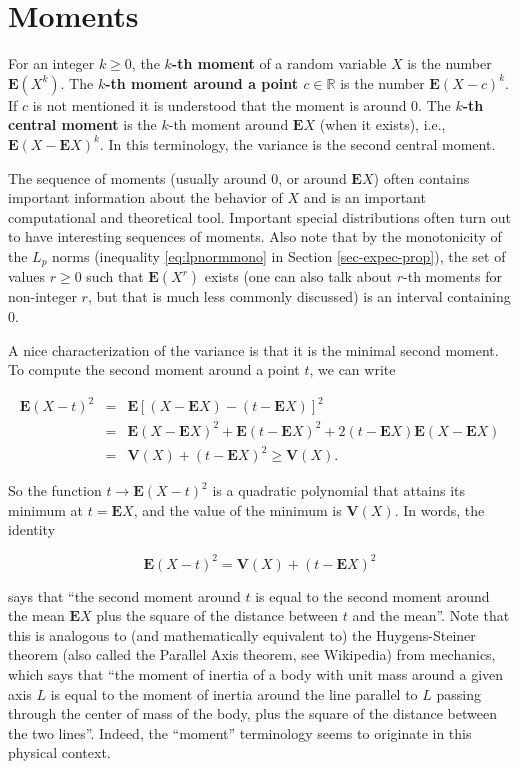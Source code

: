 \documentclass[11pt]{report}
\newcommand{\R}{\mathbb{R}}
\theoremstyle{plain}
\theoremstyle{definition}
\begin{document}
\section{Moments}

For an integer $k\ge 0$, the \textbf{$k$-th moment} of a
random variable $X$ is the number $\mathbf{E}(X^k)$.
The \textbf{$k$-th moment around a point $c\in\R$} is the
number $\mathbf{E}(X-c)^k$. If $c$ is not mentioned
it is understood that the moment is around 0. The
\textbf{$k$-th central moment} is the $k$-th moment around
$\mathbf{E} X$ (when it exists), i.e.,
$\mathbf{E}(X-\mathbf{E} X)^k$. In this terminology,
the variance is the second central moment.

The sequence of moments (usually around 0, or around
$\mathbf{E} X$) often contains important information
about the behavior of $X$ and is an important
computational and theoretical tool. Important special
distributions often turn out to have interesting
sequences of moments. Also note that by the
monotonicity of the $L_p$ norms (inequality
\eqref{eq:lpnormmono} in Section \ref{sec-expec-prop}), the
set of values $r\ge 0$ such that $\mathbf{E}(X^r)$
exists (one can also talk about $r$-th moments for
non-integer $r$, but that is much less commonly
discussed) is an interval containing $0$.

A nice characterization of the variance is that it is
the minimal second moment. To compute the second
moment around a point $t$, we can write

\begin{eqnarray*}
\mathbf{E}(X-t)^2 &=& \mathbf{E}[ (X-\mathbf{E} X)-(t-\mathbf{E} X)]^2 \\ &=& \mathbf{E}(X-\mathbf{E} X)^2 + \mathbf{E}(t-\mathbf{E} X)^2 + 2(t-\mathbf{E} X) \mathbf{E}(X-\mathbf{E} X) \\
&=& \mathbf{V}(X) + (t-\mathbf{E} X)^2 \ge \mathbf{V}(X).
\end{eqnarray*}

\noindent So the function $t\to\mathbf{E}(X-t)^2$ is a
quadratic polynomial that attains its minimum at
$t=\mathbf{E} X$, and the value of the minimum is
$\mathbf{V}(X)$. In words, the identity

\[
\mathbf{E}(X-t)^2 = \mathbf{V}(X) + (t-\mathbf{E} X)^2
\]

\noindent says that ``the second moment around $t$ is equal to
the second moment around the mean $\mathbf{E} X$ plus
the square of the distance between $t$ and the
mean''. Note that this is analogous to (and
mathematically equivalent to) the Huygens-Steiner
theorem (also called the Parallel Axis theorem, see
Wikipedia) from mechanics, which says that ``the
moment of inertia of a body with unit mass around a
given axis $L$ is equal to the moment of inertia
around the line parallel to $L$ passing through the
center of mass of the body, plus the square of the
distance between the two lines''. Indeed, the
``moment'' terminology seems to originate in this
physical context.
\end{document}
